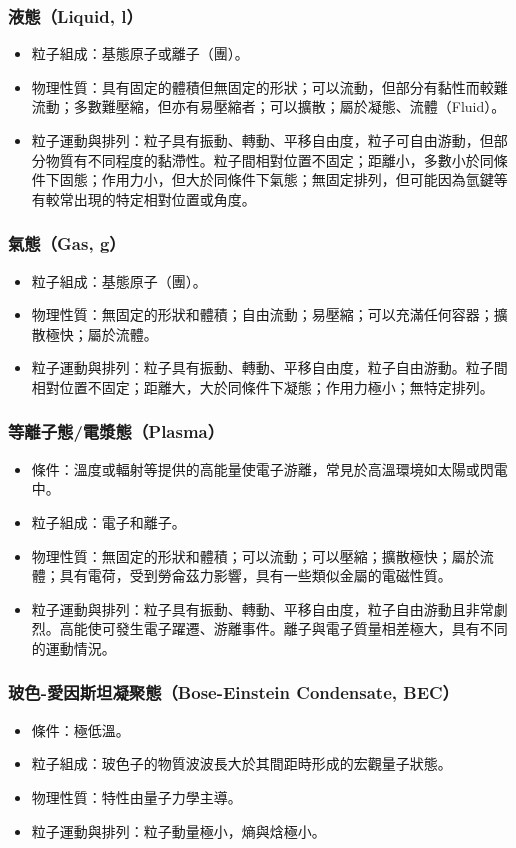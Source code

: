 \documentclass[a4paper,12pt]{report}
\begin{document}
\subsubsection{液態（Liquid, l）}
\begin{itemize}
\item 粒子組成：基態原子或離子（團）。
\item 物理性質：具有固定的體積但無固定的形狀；可以流動，但部分有黏性而較難流動；多數難壓縮，但亦有易壓縮者；可以擴散；屬於凝態、流體（Fluid）。
\item 粒子運動與排列：粒子具有振動、轉動、平移自由度，粒子可自由游動，但部分物質有不同程度的黏滯性。粒子間相對位置不固定；距離小，多數小於同條件下固態；作用力小，但大於同條件下氣態；無固定排列，但可能因為氫鍵等有較常出現的特定相對位置或角度。
\end{itemize}
\subsubsection{氣態（Gas, g）}
\begin{itemize}
\item 粒子組成：基態原子（團）。
\item 物理性質：無固定的形狀和體積；自由流動；易壓縮；可以充滿任何容器；擴散極快；屬於流體。
\item 粒子運動與排列：粒子具有振動、轉動、平移自由度，粒子自由游動。粒子間相對位置不固定；距離大，大於同條件下凝態；作用力極小；無特定排列。
\end{itemize}
\subsubsection{等離子態/電漿態（Plasma）}
\begin{itemize}
\item 條件：溫度或輻射等提供的高能量使電子游離，常見於高溫環境如太陽或閃電中。
\item 粒子組成：電子和離子。
\item 物理性質：無固定的形狀和體積；可以流動；可以壓縮；擴散極快；屬於流體；具有電荷，受到勞侖茲力影響，具有一些類似金屬的電磁性質。
\item 粒子運動與排列：粒子具有振動、轉動、平移自由度，粒子自由游動且非常劇烈。高能使可發生電子躍遷、游離事件。離子與電子質量相差極大，具有不同的運動情況。
\end{itemize}
\subsubsection{玻色-愛因斯坦凝聚態（Bose-Einstein Condensate, BEC）}
\begin{itemize}
\item 條件：極低溫。
\item 粒子組成：玻色子的物質波波長大於其間距時形成的宏觀量子狀態。
\item 物理性質：特性由量子力學主導。
\item 粒子運動與排列：粒子動量極小，熵與焓極小。
\end{itemize}
\end{document}

